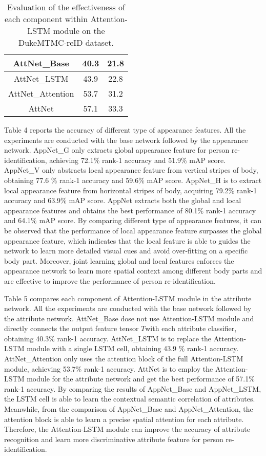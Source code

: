 \documentclass[sigconf]{acmart}
\begin{document}
\begin{table}[htbp]
\begin{center}
\begin{tabular}{|c|c|c|}
			\hline
			AttNet\_Base&40.3&21.8\\
			\hline
			AttNet\_LSTM&43.9&22.8\\
			\hline
			AttNet\_Attention&53.7&31.2\\
			\hline
			AttNet&57.1&33.3\\
			\hline
		\end{tabular}
	\end{center}
	\caption{Evaluation of the effectiveness of each component within Attention-LSTM module on the DukeMTMC-reID dataset.}
\end{table}Table 4 reports the accuracy of different type of appearance features. All the experiments are conducted with the base network followed by the appearance network. AppNet\_G only extracts global appearance feature for person re-identification, achieving 72.1\% rank-1 accuracy and 51.9\% mAP score. AppNet\_V only abstracts local appearance feature from vertical stripes of body, obtaining 77.6 \% rank-1 accuracy and 59.6\% mAP score. AppNet\_H is to extract local appearance feature from horizontal stripes of body, acquiring 79.2\% rank-1 accuracy and 63.9\% mAP score. AppNet extracts both the global and local appearance features and obtains the best performance of 80.1\% rank-1 accuracy and 64.1\% mAP score. By comparing different type of appearance features, it can be observed that the performance of local appearance feature surpasses the global appearance feature, which indicates that the local feature is able to guides the network to learn more detailed visual cues and avoid over-fitting on a specific body part. Moreover, joint learning global and local features enforces the appearance network to learn more spatial context among different body parts and are effective to improve the performance of person re-identification.

Table 5 compares each component of Attention-LSTM module in the attribute network. All the experiments are conducted with the base network followed by the attribute network. AttNet\_Base dose not use Attention-LSTM module and directly connects the output feature tensor \boldmath$T$\unboldmath with each attribute classifier, obtaining 40.3\% rank-1 accuracy. AttNet\_LSTM is to replace the Attention-LSTM module with a single LSTM cell, obtaining 43.9 \% rank-1 accuracy. AttNet\_Attention only uses the attention block of the full Attention-LSTM module, achieving 53.7\% rank-1 accuracy. AttNet is to employ the Attention-LSTM module for the attribute network and get the best performance of 57.1\% rank-1 accuracy. By comparing the results of AppNet\_Base and AppNet\_LSTM, the LSTM cell is able to learn the contextual semantic correlation of attributes. Meanwhile, from the comparison of AppNet\_Base and AppNet\_Attention, the attention block is able to learn a precise spatial attention for each attribute. Therefore, the Attention-LSTM module can improve the accuracy of attribute recognition and learn more discriminative attribute feature for person re-identification.
\end{document}
